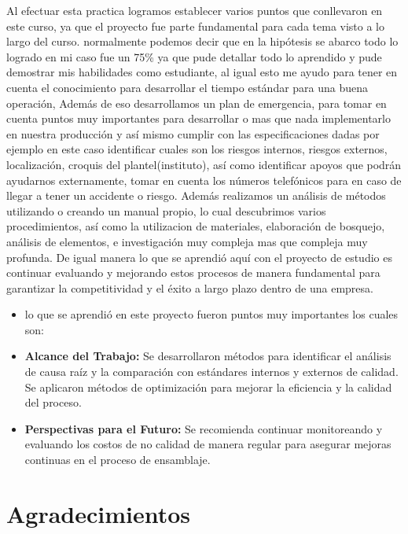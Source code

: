     Al efectuar esta practica logramos establecer varios puntos que conllevaron en este curso, ya que el proyecto fue parte fundamental para cada tema visto a lo largo del curso. normalmente podemos decir que en la hipótesis se abarco todo lo logrado en mi caso fue un 75\% ya que pude detallar todo lo aprendido y pude demostrar mis habilidades como estudiante, al igual esto me ayudo para tener en cuenta el conocimiento para desarrollar el tiempo estándar para una buena operación, 
    Además de eso desarrollamos un plan de emergencia, para tomar en cuenta puntos muy importantes para desarrollar o mas que nada implementarlo en nuestra producción y así mismo cumplir con las especificaciones dadas por ejemplo en este caso identificar cuales son los riesgos internos, riesgos externos, localización, croquis del plantel(instituto), así como identificar apoyos que podrán ayudarnos externamente, tomar en cuenta los números telefónicos para en caso de llegar a tener un accidente o riesgo.
    Además realizamos un análisis de métodos utilizando o creando un manual propio, lo cual descubrimos varios procedimientos, así como la utilizacion de materiales, elaboración de bosquejo, análisis de elementos, e investigación muy compleja mas que compleja muy profunda.
    De igual manera lo que se aprendió aquí con el proyecto de estudio es continuar evaluando y mejorando estos procesos de manera fundamental para garantizar la competitividad y el éxito a largo plazo dentro de una empresa.
    \begin{itemize}
    \item lo que se aprendió en este proyecto fueron puntos muy importantes los cuales son:
    
    \item \textbf{Alcance del Trabajo:}
    Se desarrollaron métodos para identificar el análisis de causa raíz y la comparación con estándares internos y externos de calidad.
    Se aplicaron métodos de optimización para mejorar la eficiencia y la calidad del proceso.
    
    \item \textbf{Perspectivas para el Futuro:}
    Se recomienda continuar monitoreando y evaluando los costos de no calidad de manera regular para asegurar mejoras continuas en el proceso de ensamblaje.
    \end{itemize}
    
    \section{Agradecimientos}
    
